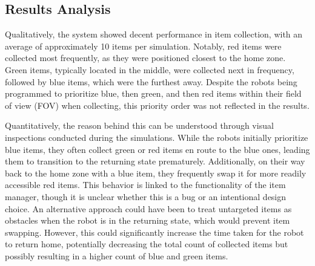 \documentclass[conference]{IEEEtran}
\begin{document}
\subsection{Results Analysis}


Qualitatively, the system showed decent performance in item collection, with an average of approximately 10 items per simulation. Notably, red items were collected most frequently, as they were positioned closest to the home zone. Green items, typically located in the middle, were collected next in frequency, followed by blue items, which were the furthest away. Despite the robots being programmed to prioritize blue, then green, and then red items within their field of view (FOV) when collecting, this priority order was not reflected in the results.

Quantitatively, the reason behind this can be understood through visual inspections conducted during the simulations. While the robots initially prioritize blue items, they often collect green or red items en route to the blue ones, leading them to transition to the returning state prematurely. Additionally, on their way back to the home zone with a blue item, they frequently swap it for more readily accessible red items. This behavior is linked to the functionality of the item manager, though it is unclear whether this is a bug or an intentional design choice. An alternative approach could have been to treat untargeted items as obstacles when the robot is in the returning state, which would prevent item swapping. However, this could significantly increase the time taken for the robot to return home, potentially decreasing the total count of collected items but possibly resulting in a higher count of blue and green items.
\end{document}
